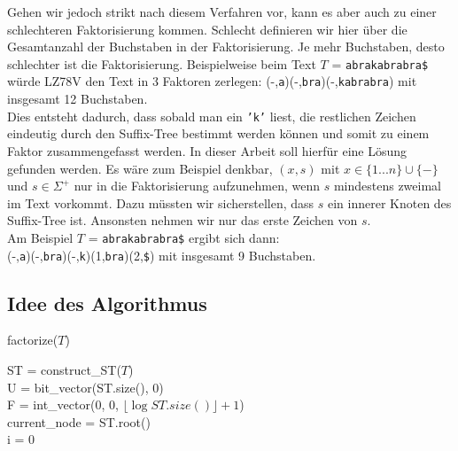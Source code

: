 \documentclass[a4paper,11pt]{scrartcl}%
\theoremstyle{nonumberplain}
\theoremstyle{change}
\theoremstyle{nonumberplain}
\theoremstyle{change}
\theoremstyle{nonumberplain}
\begin{document}
	
	
	
	
	
	Gehen wir jedoch strikt nach diesem Verfahren vor, kann es aber auch zu einer schlechteren Faktorisierung kommen. Schlecht definieren wir hier über die Gesamtanzahl der Buchstaben in der Faktorisierung. Je mehr Buchstaben, desto schlechter ist die Faktorisierung.  Beispielweise beim Text $T$ = \texttt{abrakabrabra\$} würde LZ78V den Text in 3 Faktoren zerlegen: (-,\texttt{a})(-,\texttt{bra})(-,\texttt{kabrabra}) mit insgesamt 12 Buchstaben.\\
	Dies entsteht dadurch, dass sobald man ein \texttt{'k'} liest, die restlichen Zeichen eindeutig durch den Suffix-Tree bestimmt werden können und somit zu einem Faktor zusammengefasst werden. In dieser Arbeit soll hierfür eine Lösung gefunden werden. Es wäre zum Beispiel denkbar, $(x,s)$ mit $x \in \{1...n\} \cup \{-\}$ und $s \in \Sigma^{+}$ nur in die Faktorisierung aufzunehmen, wenn $s$ mindestens zweimal im Text vorkommt. Dazu müssten wir sicherstellen, dass $s$ ein innerer Knoten des Suffix-Tree ist. Ansonsten nehmen wir nur das erste Zeichen von $s$.\\ Am Beispiel $T$ = \texttt{abrakabrabra\$} ergibt sich dann:\\
	(-,\texttt{a})(-,\texttt{bra})(-,\texttt{k})(1,\texttt{bra})(2,\texttt{\$}) mit insgesamt 9 Buchstaben.

	
	\subsection{Idee des Algorithmus}
	
		\begin{algorithm}[H]
		\caption{factorize($T$)}
		\SetAlgoLined
		ST = construct\_ST($T$)\\
		U = bit\_vector(ST.size(), 0)\\
		F = int\_vector(0, 0, $\lfloor\log ST.size()\rfloor + 1$)\\
		current\_node = ST.root()\\
		i = 0
		
		
		\end{algorithm}
	
\end{document}
